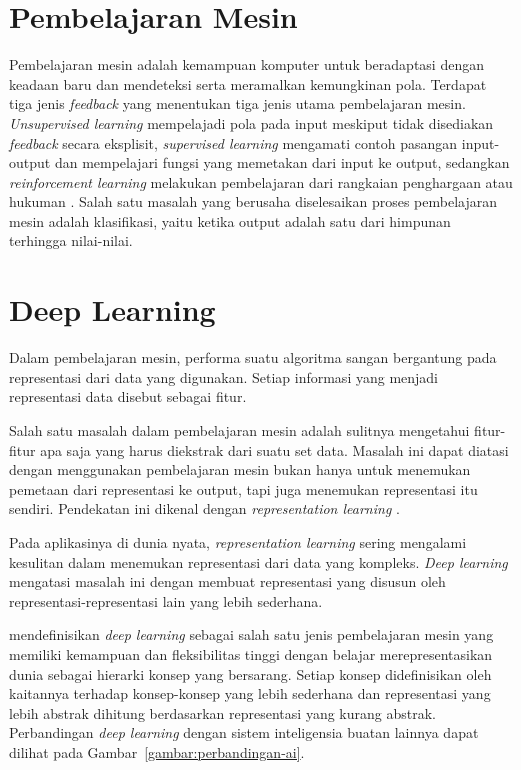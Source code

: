 \section{Pembelajaran Mesin}
Pembelajaran mesin adalah kemampuan komputer untuk beradaptasi dengan keadaan baru dan mendeteksi serta meramalkan kemungkinan pola. Terdapat tiga jenis \textit{feedback} yang menentukan tiga jenis utama pembelajaran mesin. \textit{Unsupervised learning} mempelajadi pola pada input meskiput tidak disediakan \textit{feedback} secara eksplisit, \textit{supervised learning} mengamati contoh pasangan input-output dan mempelajari fungsi yang memetakan dari input ke output, sedangkan \textit{reinforcement learning} melakukan pembelajaran dari rangkaian penghargaan atau hukuman \citep{Russell:2009:AIM:1671238}. Salah satu masalah yang berusaha diselesaikan proses pembelajaran mesin adalah klasifikasi, yaitu ketika output adalah satu dari himpunan terhingga nilai-nilai.


\section{Deep Learning}
Dalam pembelajaran mesin, performa suatu algoritma sangan bergantung pada representasi dari data yang digunakan. Setiap informasi yang menjadi representasi data disebut sebagai fitur.

Salah satu masalah dalam pembelajaran mesin adalah sulitnya mengetahui fitur-fitur apa saja yang harus diekstrak dari suatu set data. Masalah ini dapat diatasi dengan menggunakan pembelajaran mesin bukan hanya untuk menemukan pemetaan dari representasi ke output, tapi juga menemukan representasi itu sendiri. Pendekatan ini dikenal dengan \textit{representation learning} \citep{goodfellow-2016}.

Pada aplikasinya di dunia nyata, \textit{representation learning} sering mengalami kesulitan dalam menemukan representasi dari data yang kompleks. \textit{Deep learning} mengatasi masalah ini dengan membuat representasi yang disusun oleh representasi-representasi lain yang lebih sederhana.

\citeauthor{goodfellow-2016} mendefinisikan \textit{deep learning} sebagai salah satu jenis pembelajaran mesin yang memiliki kemampuan dan fleksibilitas tinggi dengan belajar merepresentasikan dunia sebagai hierarki konsep yang bersarang. Setiap konsep didefinisikan oleh kaitannya terhadap konsep-konsep yang lebih sederhana dan representasi yang lebih abstrak dihitung berdasarkan representasi yang kurang abstrak. Perbandingan \textit{deep learning} dengan sistem inteligensia buatan lainnya dapat dilihat pada Gambar~\ref{gambar:perbandingan-ai}.

